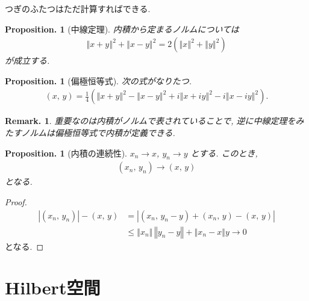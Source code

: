 \documentclass[openany, a4paper, oneside]{jsbook}
\theoremstyle{break}
\theoremstyle{breakdefn}
\newtheorem{prop}[thm]{Proposition.}
\newtheorem{rem}[thm]{Remark.}
\newcommand{\abs}[1]{\left|#1\right|}
\newcommand{\norm}[1]{\left\Vert#1\right\Vert}
\newcommand{\rbk}[1]{\left (#1\right)}
\newcommand{\rbkt}[2]{\left ( #1,\,#2 \right)}
\begin{document}
つぎのふたつはただ計算すればできる.
\begin{prop}[中線定理]
 内積から定まるノルムについては
 \begin{align}
  \norm{x + y}^2 + \norm{x - y}^2
  =
  2 \rbk{\norm{x}^2 + \norm{y}^2}
 \end{align}
 が成立する.
\end{prop}
\begin{prop}[偏極恒等式]
次の式がなりたつ.
\begin{align}
 \rbkt{x}{y}
 =
 \frac{1}{4}\rbk{\norm{x + y}^2 - \norm{x - y}^2 + i \norm{x + iy}^2 - i \norm{x - iy}^2}.
\end{align}
\end{prop}
\begin{rem}
重要なのは内積がノルムで表されていることで,
逆に中線定理をみたすノルムは偏極恒等式で内積が定義できる.
\end{rem}

\begin{prop}[内積の連続性]
 $x_n \to x$, $y_n \to y$ とする.
 このとき,
 \begin{align}
  \rbkt{x_n}{y_n} \to \rbkt{x}{y}
 \end{align}
 となる.
\end{prop}
\begin{proof}
\begin{align}
 \abs{\rbkt{x_n}{y_n}} - \rbkt{x}{y}
 &=
 \abs{\rbkt{x_n}{y_n - y} + \rbkt{x_n}{y} - \rbkt{x}{y}} \\
 &\le
 \norm{x_n} \, \norm{y_n - y} + \norm{x_n - x}{y} \to 0
\end{align}
となる.
\end{proof}
\section{Hilbert空間}
\end{document}
